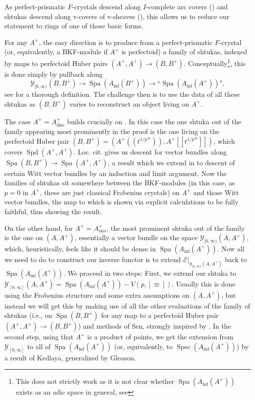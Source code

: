 \documentclass[10pt,twoside]{article}
\numberwithin{equation}{section}
\theoremstyle{plain}
\theoremstyle{definition}
\DeclareMathOperator{\Spec}{Spec}
\DeclareMathOperator{\Spa}{Spa}
\DeclareMathOperator{\Spd}{Spd}
\DeclareMathOperator{\ana}{ana}
\DeclareMathOperator{\disc}{disc}
\newcommand{\MCE}{\mathcal{E}}
\newcommand{\MCY}{\mathcal{Y}}
\DeclareMathOperator{\Inf}{inf}
\newcommand{\Ainf}{A_{\Inf}}
\newcommand{\Ycc}{\MCY_{[0,\infty]}}
\newcommand{\Yco}{\MCY_{[0,\infty)}}
\begin{document}
As perfect-prismatic \(F\)-crystals descend along \(I\)-complete arc covers () and shtukas descend along v-covers of v-sheaves (), this allows us to reduce our statement to rings of one of those basic forms.\par
For any \(A^+\), the easy direction is to produce from a perfect-prismatic \(F\)-crystal (or, equivalently, a BKF-module if \(A^+\) is perfectoid) a family of shtukas, indexed by maps to perfectoid Huber pairs \((A^+,A^+)\to (B,B^+)\). Conceptually\footnote{This does not strictly work as it is not clear whether \(\Spa(\Ainf(A^+))\) exists as an adic space in general, see }, this is done simply by pullback along
\[\Yco(B,B^+)\longrightarrow \Spa(\Ainf(B^+))\longrightarrow \text{``\(\Spa(\Ainf(A^+))\)"},\]
see  for a thorough definition. The challenge then is to use the data of all these shtukas as \((B,B^+)\) varies to reconstruct an object living on \(A^+\).\par
The case \(A^+=A^+_{\disc}\) builds crucially on \cite[Corollary 5.3]{Kim}. In this case the one shtuka out of the family appearing most prominently in the proof is the one living on the perfectoid Huber pair \((B,B^+)=(A^+((t^{1/p^\infty})),A^+[[t^{1/p^\infty}]])\), which covers \(\Spd(A^+,A^+)\). Loc. cit. gives us descent for vector bundles along \(\Spa(B,B^+)\to \Spa(A^+,A^+)\), a result which we extend in  to descent of certain Witt vector bundles by an induction and limit argument. Now the families of shtukas sit somewhere between the BKF-modules (in this case, as \(p=0\) in \(A^+\), these are just classical Frobenius crystals) on \(A^+\) and those Witt vector bundles, the map to which is shown via explicit calculations to be fully faithful, thus showing the result.\par
On the other hand, for \(A^+=A^+_{\ana}\), the most prominent shtuka out of the family is the one on \((A,A^+)\), essentially a vector bundle on the space \(\Yco(A,A^+)\), which, heuristically, feels like it should be dense in \(\Spa(\Ainf(A^+))\). Now all we need to do to construct our inverse functor is to extend \(\MCE|_{\Yco(A,A^+)}\) back to \(\Spa(\Ainf(A^+))\). We proceed in two steps: First, we extend our shtuka to \(\Ycc(A,A^+)=\Spa(\Ainf(A^+)) - V(p,[\varpi])\). Usually this is done using the Frobenius structure and some extra assumptions on \((A,A^+)\), but instead we will get this by making use of all the other evaluations of the family of shtukas (i.e., on \(\Spa(B,B^+)\) for any map to a perfectoid Huber pair \((A^+,A^+)\to (B,B^+)\)) and methods of Sen, strongly inspired by \cite[Theorem 2.3.8]{PR}. In the second step, using that \(A^+\) is a product of points, we get the extension from \(\Ycc\) to all of \(\Spa(\Ainf(A^+))\) (or, equivalently, to \(\Spec(\Ainf(A^+))\)) by a result of Kedlaya, generalized by Gleason.\par
\end{document}
